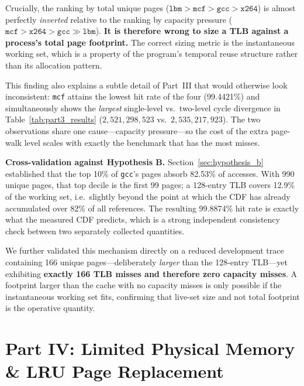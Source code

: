 \documentclass[11pt,a4paper]{article}
\begin{document}
Crucially, the ranking by total unique pages ($\texttt{lbm} > \texttt{mcf} > \texttt{gcc} > \texttt{x264}$) is almost perfectly \emph{inverted} relative to the ranking by capacity pressure ($\texttt{mcf} > \texttt{x264} > \texttt{gcc} \gg \texttt{lbm}$). \textbf{It is therefore wrong to size a TLB against a process's total page footprint.} The correct sizing metric is the instantaneous working set, which is a property of the program's temporal reuse structure rather than its allocation pattern.

This finding also explains a subtle detail of Part~III that would otherwise look inconsistent: \texttt{mcf} attains the lowest hit rate of the four (99.4421\%) and simultaneously shows the \emph{largest} single-level vs.\ two-level cycle divergence in Table~\ref{tab:part3_results} ($2,521,298,523$ vs.\ $2,535,217,923$). The two observations share one cause---capacity pressure---so the cost of the extra page-walk level scales with exactly the benchmark that has the most misses.

\noindent\textbf{Cross-validation against Hypothesis B.}
Section~\ref{sec:hypothesis_b} established that the top 10\% of \texttt{gcc}'s pages absorb 82.53\% of accesses. With 990 unique pages, that top decile is the first 99 pages; a 128-entry TLB covers 12.9\% of the working set, i.e.\ slightly beyond the point at which the CDF has already accumulated over 82\% of all references. The resulting 99.8874\% hit rate is exactly what the measured CDF predicts, which is a strong independent consistency check between two separately collected quantities.

We further validated this mechanism directly on a reduced development trace containing 166 unique pages---deliberately \emph{larger} than the 128-entry TLB---yet exhibiting \textbf{exactly 166 TLB misses and therefore zero capacity misses}. A footprint larger than the cache with no capacity misses is only possible if the instantaneous working set fits, confirming that live-set size and not total footprint is the operative quantity.

\section{Part IV: Limited Physical Memory \& LRU Page Replacement}
\label{sec:part4}
\end{document}

